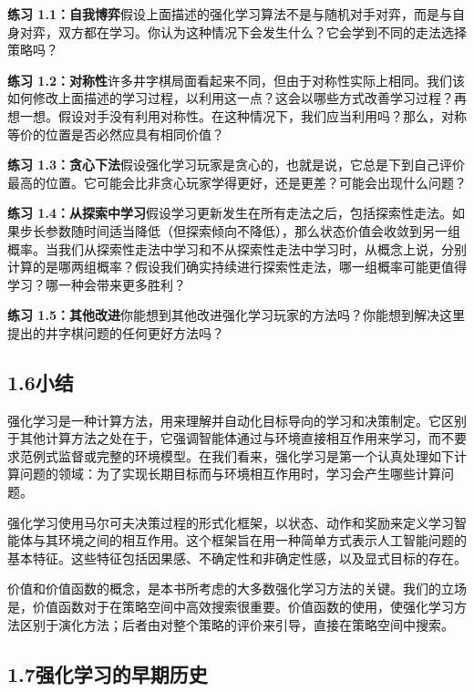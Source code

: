 \documentclass[UTF8,12pt,a4paper,fontset=fandol]{ctexart}
\begin{document}
\noindent\textbf{练习 1.1：自我博弈}\quad 假设上面描述的强化学习算法不是与随机对手对弈，而是与自身对弈，双方都在学习。你认为这种情况下会发生什么？它会学到不同的走法选择策略吗？

\noindent\textbf{练习 1.2：对称性}\quad 许多井字棋局面看起来不同，但由于对称性实际上相同。我们该如何修改上面描述的学习过程，以利用这一点？这会以哪些方式改善学习过程？再想一想。假设对手没有利用对称性。在这种情况下，我们应当利用吗？那么，对称等价的位置是否必然应具有相同价值？

\noindent\textbf{练习 1.3：贪心下法}\quad 假设强化学习玩家是贪心的，也就是说，它总是下到自己评价最高的位置。它可能会比非贪心玩家学得更好，还是更差？可能会出现什么问题？

\noindent\textbf{练习 1.4：从探索中学习}\quad 假设学习更新发生在所有走法之后，包括探索性走法。如果步长参数随时间适当降低（但探索倾向不降低），那么状态价值会收敛到另一组概率。当我们从探索性走法中学习和不从探索性走法中学习时，从概念上说，分别计算的是哪两组概率？假设我们确实持续进行探索性走法，哪一组概率可能更值得学习？哪一种会带来更多胜利？

\noindent\textbf{练习 1.5：其他改进}\quad 你能想到其他改进强化学习玩家的方法吗？你能想到解决这里提出的井字棋问题的任何更好方法吗？

\subsection*{1.6\quad 小结}

强化学习是一种计算方法，用来理解并自动化目标导向的学习和决策制定。它区别于其他计算方法之处在于，它强调智能体通过与环境直接相互作用来学习，而不要求范例式监督或完整的环境模型。在我们看来，强化学习是第一个认真处理如下计算问题的领域：为了实现长期目标而与环境相互作用时，学习会产生哪些计算问题。

强化学习使用马尔可夫决策过程的形式化框架，以状态、动作和奖励来定义学习智能体与其环境之间的相互作用。这个框架旨在用一种简单方式表示人工智能问题的基本特征。这些特征包括因果感、不确定性和非确定性感，以及显式目标的存在。

价值和价值函数的概念，是本书所考虑的大多数强化学习方法的关键。我们的立场是，价值函数对于在策略空间中高效搜索很重要。价值函数的使用，使强化学习方法区别于演化方法；后者由对整个策略的评价来引导，直接在策略空间中搜索。

\subsection*{1.7\quad 强化学习的早期历史}
\end{document}
